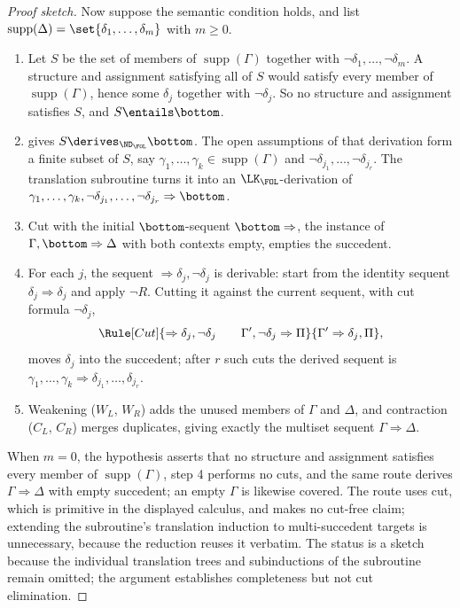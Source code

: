 \begin{proof}[Proof sketch]
Now suppose the semantic condition holds, and list
\(\operatorname{supp}(\Delta)=\set{\delta_1,\ldots,\delta_m}\) with
\(m\geq0\).
\begin{enumerate}
  \item Let \(S\) be the set of members of
        \(\operatorname{supp}(\Gamma)\) together with
        \(\neg\delta_1,\ldots,\neg\delta_m\).  A structure and
        assignment satisfying all of \(S\) would satisfy every member
        of \(\operatorname{supp}(\Gamma)\), hence some \(\delta_j\)
        together with \(\neg\delta_j\).  So no structure and
        assignment satisfies \(S\), and \(S\entails\bottom\).
  \item {} gives
        \(S\derives_{\ND_{\FOL}}\bottom\).  The open assumptions of
        that derivation form a finite subset of \(S\), say
        \(\gamma_1,\ldots,\gamma_k\in\operatorname{supp}(\Gamma)\) and
        \(\neg\delta_{j_1},\ldots,\neg\delta_{j_r}\).  The translation
        subroutine turns it into an \(\LK_{\FOL}\)-derivation of
        \(\gamma_1,\ldots,\gamma_k,
        \neg\delta_{j_1},\ldots,\neg\delta_{j_r}\Rightarrow\bottom\).
  \item Cut with the initial \(\bottom\)-sequent
        \(\bottom\Rightarrow\), the instance of
        \(\Gamma,\bottom\Rightarrow\Delta\) with both contexts empty,
        empties the succedent.
  \item For each \(j\), the sequent
        \(\Rightarrow\delta_j,\neg\delta_j\) is derivable: start from
        the identity sequent \(\delta_j\Rightarrow\delta_j\) and apply
        \(\neg R\).  Cutting it against the current sequent, with cut
        formula \(\neg\delta_j\),
        \[
         \Rule[Cut]{\Rightarrow\delta_j,\neg\delta_j\qquad
          \Gamma',\neg\delta_j\Rightarrow\Pi}
          {\Gamma'\Rightarrow\delta_j,\Pi},
        \]
        moves \(\delta_j\) into the succedent; after \(r\) such cuts
        the derived sequent is
        \(\gamma_1,\ldots,\gamma_k\Rightarrow
        \delta_{j_1},\ldots,\delta_{j_r}\).
  \item Weakening (\(W_L\), \(W_R\)) adds the unused members of
        \(\Gamma\) and \(\Delta\), and contraction (\(C_L\),
        \(C_R\)) merges duplicates, giving exactly the multiset
        sequent \(\Gamma\Rightarrow\Delta\).
\end{enumerate}
When \(m=0\), the hypothesis asserts that no structure and assignment
satisfies every member of \(\operatorname{supp}(\Gamma)\), step 4
performs no cuts, and the same route derives
\(\Gamma\Rightarrow\Delta\) with empty succedent; an empty \(\Gamma\) is
likewise covered.  The route uses cut, which is primitive in the
displayed calculus, and makes no cut-free claim; extending the
subroutine's translation induction to multi-succedent targets is
unnecessary, because the reduction reuses it verbatim.  The status is a
sketch because the individual translation trees and subinductions of the
subroutine remain omitted; the argument establishes completeness but not
cut elimination.
\end{proof}

